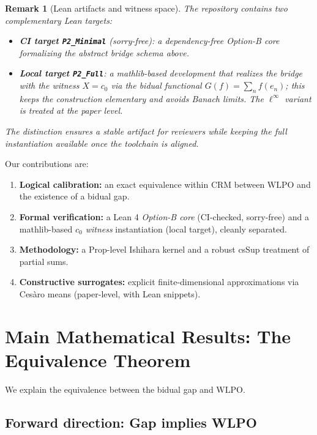 \documentclass[11pt]{article}  %
\newtheorem{remark}[theorem]{Remark}
\newenvironment{rem}{\begin{remark}}{\end{remark}}
\newtheorem{remark}[theorem]{Remark}
\newenvironment{rem}{\begin{remark}}{\end{remark}}
\newcommand{\WLPO}{\mathrm{WLPO}}
\newcommand{\CRM}{\mathrm{CRM}}
\begin{document}
\begin{rem}[Lean artifacts and witness space]
The repository contains two complementary Lean targets:
\begin{itemize}
\item \textbf{CI target \texttt{P2\_Minimal}} (sorry-free): a dependency-free \emph{Option-B core} formalizing the abstract bridge schema above.
\item \textbf{Local target \texttt{P2\_Full}}: a mathlib-based development that \emph{realizes} the bridge with the witness $X=c_0$ via the bidual functional $G(f)=\sum_n f(e_n)$; this keeps the construction elementary and avoids Banach limits.  The $\ell^\infty$ variant is treated at the paper level.
\end{itemize}
The distinction ensures a stable artifact for reviewers while keeping the full instantiation available once the toolchain is aligned.
\end{rem}

Our contributions are:
\begin{enumerate}[label=\arabic*.]
\item \textbf{Logical calibration:} an exact equivalence within $\CRM$ between $\WLPO$ and the existence of a bidual gap.
\item \textbf{Formal verification:} a Lean 4 \emph{Option-B core} (CI-checked, sorry-free) and a mathlib-based \emph{$c_0$ witness} instantiation (local target), cleanly separated.
\item \textbf{Methodology:} a Prop-level Ishihara kernel and a robust csSup treatment of partial sums.
\item \textbf{Constructive surrogates:} explicit finite-dimensional approximations via Ces\`aro means (paper-level, with Lean snippets).
\end{enumerate}

\section{Main Mathematical Results: The Equivalence Theorem}

We explain the equivalence between the bidual gap and $\WLPO$.

\subsection{Forward direction: Gap implies WLPO}
\end{document}
